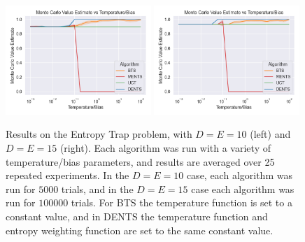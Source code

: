         \begin{figure}
            \centering
            \includegraphics[width=0.49\textwidth]{figures/ch4/entropy_trap_10.png}
            \includegraphics[width=0.49\textwidth]{figures/ch4/entropy_trap_15.png}
            \caption[Results on the Entropy Trap problem.]{Results on the Entropy Trap problem, with $D=E=10$ (left) and $D=E=15$ (right). Each algorithm was run with a variety of temperature/bias parameters, and results are averaged over 25 repeated experiments. In the $D=E=10$ case, each algorithm was run for $5000$ trials, and in the $D=E=15$ case each algorithm was run for $100000$ trials. For BTS the temperature function is set to a constant value, and in DENTS the temperature function and entropy weighting function are set to the same constant value.  }
            \label{fig:entropy_trap_results}
        \end{figure}
        
















